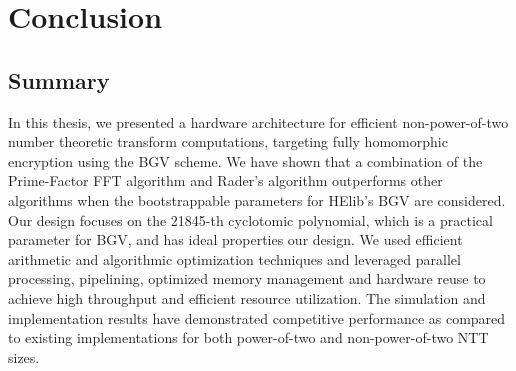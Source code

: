 \documentclass[english,master=eelt,masteroption=ec]{kulemt}
\begin{document}
\chapter{Conclusion}

\section{Summary}
In this thesis, we presented a hardware architecture for efficient non-power-of-two number theoretic transform computations, targeting fully homomorphic encryption using the BGV scheme. We have shown that a combination of the Prime-Factor FFT algorithm and Rader's algorithm outperforms other algorithms when the bootstrappable parameters for HElib's BGV are considered. Our design focuses on the 21845-th cyclotomic polynomial, which is a practical parameter for BGV, and has ideal properties our design. We used efficient arithmetic and algorithmic optimization techniques and leveraged parallel processing, pipelining, optimized memory management and hardware reuse to achieve high throughput and efficient resource utilization. The simulation and implementation results have demonstrated competitive performance as compared to existing implementations for both power-of-two and non-power-of-two NTT sizes.
\end{document}
